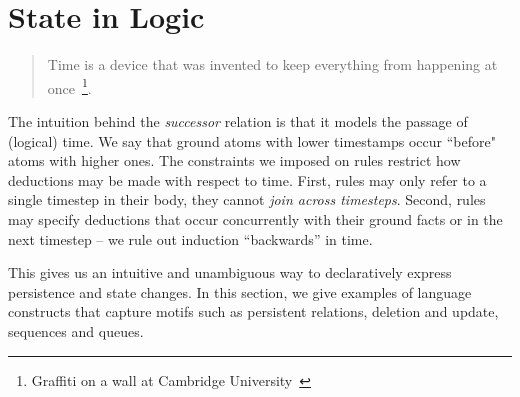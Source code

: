  \section{State in Logic}





\begin{quote}
Time is a device that was invented to keep everything from happening at once~\footnote{Graffiti on a wall at Cambridge University~\cite{scheme}}.
\end{quote}

The intuition behind the \emph{successor} relation is that it models the
passage of (logical) time.  We say that ground atoms with lower timestamps
occur ``before" atoms with higher ones.
The constraints we imposed on \slang rules restrict how deductions may be made
with respect to time.  First, rules may only refer to a single timestep in
their body, they cannot {\em join across timesteps}.  Second, rules may specify
deductions that occur concurrently with their ground facts or in the next
timestep -- we rule out induction ``backwards'' in time.

This gives us an intuitive and unambiguous way to declaratively express persistence and state changes.  In this section, we 
give examples of language constructs that capture motifs such as persistent relations, deletion and update, sequences
and queues.

